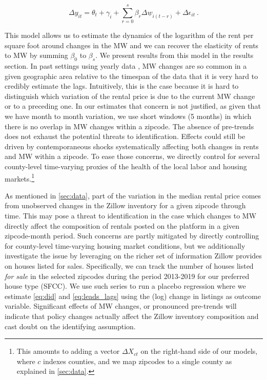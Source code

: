 \begin{equation}\label{eq:lags}
        \Delta y_{it} = \theta_t + \gamma_i 
        		+ \sum_{r=0}^{s}\beta_r \Delta \underline{w}_{i(t-r)} 
        		+ \Delta \epsilon_{it} \ .
\end{equation}

This model allows us to estimate the dynamics of the logarithm of the rent per square foot around 
changes in the MW and we can recover the elasticity of rents to MW by summing $\beta_0$ to 
$\beta_{s}$. We present results from this model in the results section. In past settings using 
yearly data \parencite{tidemann2018mw,yamagishi2019minimum}, MW changes are so common in a given 
geographic area relative to the timespan of the data that it is very hard to credibly estimate the 
lags. Intuitively, this is the case because it is hard to distinguish which variation of the rental 
price is due to the current MW change or to a preceding one. In our estimates that concern is not 
justified, as given that we have month to month variation, we use short windows (5 months) in which 
there is no overlap in MW changes within a zipcode. The absence of pre-trends does not exhaust the 
potential threats to identification. Effects could still be driven by contemporaneous shocks 
systematically affecting both changes in rents and MW within a zipcode. To ease those concerns, we 
directly control for several county-level time-varying proxies of the health of the local labor and 
housing markets.\footnote{This amounts to adding a vector $\Delta X_{ct}$ on the right-hand side of 
	our models, where $c$ indexes counties, and we map zipcodes to a single county as explained in 
	\autoref{sec:data}.}

As mentioned in \autoref{sec:data}, part of the variation in the median rental price comes from 
unobserved changes in the Zillow inventory for a given zipcode through time. This may pose a threat 
to identification in the case which changes to MW directly affect the composition of rentals posted 
on the platform in a given zipcode-month period. Such concerns are partly mitigated by directly 
controlling for county-level time-varying housing market conditions, but we additionally investigate 
the issue by leveraging on the richer set of information Zillow provides on houses listed for sales. Specifically, we can track the number of houses listed \textit{for sale} in the selected zipcodes 
during the period 2013-2019 for our preferred house type (SFCC). We use such series to run a placebo 
regression where we estimate \autoref{eq:did} and \autoref{eq:leads_lags} using the (log) change in 
listings as outcome variable.  Significant effects of MW changes, or pronounced pre-trends will 
indicate that policy changes actually affect the Zillow inventory composition and cast doubt on the 
identifying assumption.

